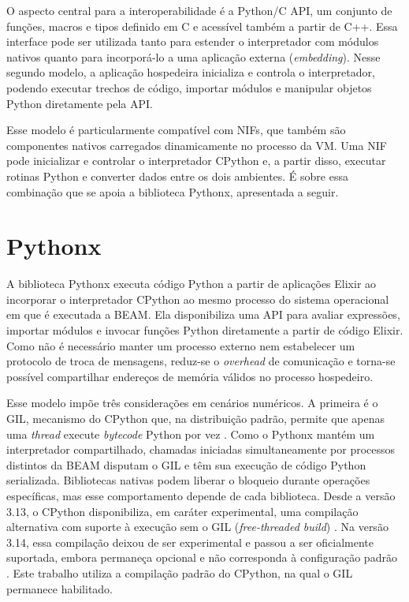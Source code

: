 O aspecto central para a interoperabilidade é a Python/C \gls{API}, um conjunto de funções, macros e tipos definido em C e acessível também a partir de C++. Essa interface pode ser utilizada tanto para estender o interpretador com módulos nativos quanto para incorporá-lo a uma aplicação externa (\textit{embedding}). Nesse segundo modelo, a aplicação hospedeira inicializa e controla o interpretador, podendo executar trechos de código, importar módulos e manipular objetos Python diretamente pela \gls{API}.

Esse modelo é particularmente compatível com \glspl{NIF}, que também são componentes nativos carregados dinamicamente no processo da \gls{VM}. Uma \gls{NIF} pode inicializar e controlar o interpretador CPython e, a partir disso, executar rotinas Python e converter dados entre os dois ambientes. É sobre essa combinação que se apoia a biblioteca Pythonx, apresentada a seguir.

\section{Pythonx}\label{sec:pythonx}

A biblioteca Pythonx \citep{pythonx2024} executa código Python a partir de aplicações Elixir ao incorporar o interpretador CPython ao mesmo processo do sistema operacional em que é executada a \gls{BEAM}. Ela disponibiliza uma \gls{API} para avaliar expressões, importar módulos e invocar funções Python diretamente a partir de código Elixir. Como não é necessário manter um processo externo nem estabelecer um protocolo de troca de mensagens, reduz-se o \textit{overhead} de comunicação e torna-se possível compartilhar endereços de memória válidos no processo hospedeiro.

Esse modelo impõe três considerações em cenários numéricos. A primeira é o \gls{GIL}, mecanismo do CPython que, na distribuição padrão, permite que apenas uma \textit{thread} execute \textit{bytecode} Python por vez \citep{gil2024}. Como o Pythonx mantém um interpretador compartilhado, chamadas iniciadas simultaneamente por processos distintos da \gls{BEAM} disputam o \gls{GIL} e têm sua execução de código Python serializada. Bibliotecas nativas podem liberar o bloqueio durante operações específicas, mas esse comportamento depende de cada biblioteca. Desde a versão 3.13, o CPython disponibiliza, em caráter experimental, uma compilação alternativa com suporte à execução sem o \gls{GIL} (\textit{free-threaded build}) \citep{pep703}. Na versão 3.14, essa compilação deixou de ser experimental e passou a ser oficialmente suportada, embora permaneça opcional e não corresponda à configuração padrão \citep{pep779}. Este trabalho utiliza a compilação padrão do CPython, na qual o \gls{GIL} permanece habilitado.

